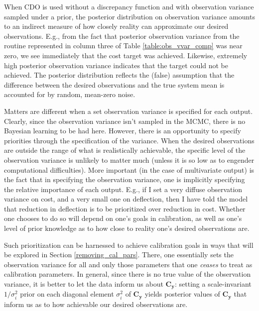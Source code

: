 \documentclass{article}
\begin{document}
When CDO is used without a discrepancy function and with observation variance sampled under a prior, the posterior distribution on observation variance amounts to an indirect measure of how closely reality can approximate our desired observations. E.g., from the fact that posterior observation variance from the routine represented in column three of Table \ref{table:obs_vvar_comp} was near zero, we see immediately that the cost target was achieved. Likewise, extremely high posterior observation variance indicates that the target could not be achieved. The posterior distribution reflects the (false) assumption that the difference between the desired observations and the true system mean is accounted for by random, mean-zero noise. 

Matters are different when a set observation variance is specified for each output. Clearly, since the observation variance isn't sampled in the MCMC, there is no Bayesian learning to be had here. However, there is an opportunity to specify priorities through the specification of the variance. When the desired observations are outside the range of what is realistically achievable, the specific level of the observation variance is unlikely to matter much (unless it is so low as to engender computational difficulties). More important (in the case of multivariate output) is the fact that in specifying the observation variance, one is implicitly specifying the relative importance of each output. E.g., if I set a very diffuse observation variance on cost, and a very small one on deflection, then I have told the model that reduction in deflection is to be prioritized over reduction in cost. Whether one chooses to do so will depend on one's goals in calibration, as well as one's level of prior knowledge as to how close to reality one's desired observations are.

Such prioritization can be harnessed to achieve calibration goals in ways that will be explored in Section \ref{removing_cal_pars}. There, one essentially sets the observation variance for all and only those parameters that one \emph{ceases} to treat as calibration parameters. In general, since there is no true value of the observation variance, it is better to let the data inform us about $\mathbf C_{\mathbf y}$: setting a scale-invariant $1/\sigma_i^2$ prior on each diagonal element $\sigma_i^2$ of $\mathbf C_{\mathbf y}$ yields posterior values of $\mathbf C_{\mathbf y}$ that inform us as to how achievable our desired observations are.
\end{document}
